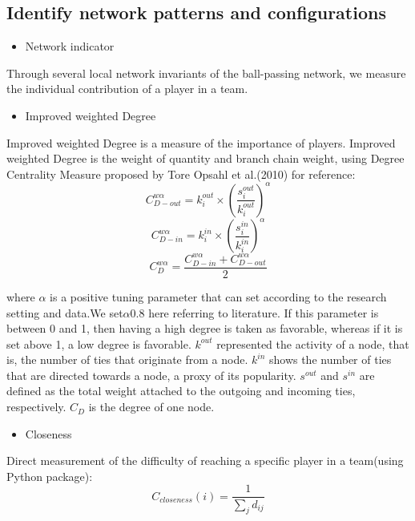 \documentclass{mcmthesis}
\begin{document}
\subsection{Identify network patterns and configurations}
\begin{itemize}
\item Network indicator
\end{itemize}

Through several local network invariants of the ball-passing network, we measure the individual contribution of a player in a team.
\begin{itemize}
\item Improved weighted Degree
\end{itemize}
Improved weighted Degree is a measure of the importance of players. Improved weighted Degree is the weight of quantity and branch chain weight, using Degree Centrality Measure proposed by Tore Opsahl et al.(2010) for reference:
\begin{equation}
C_{D-out}^{w\alpha}=k_{i}^{out}\times\left( \frac{s_{i}^{out}}{k_{i}^{out}}\right)^{\alpha}
\end{equation}
\begin{equation}
C_{D-in}^{w\alpha}=k_{i}^{in}\times\left( \frac{s_{i}^{in}}{k_{i}^{in}}\right)^{\alpha}
\end{equation}
\begin{equation}
C_{D}^{w\alpha}=\frac{C_{D-in}^{w\alpha}+C_{D-out}^{w\alpha}}{2}
\end{equation}


where $\alpha$ is a positive tuning parameter that can set according to the research setting and data.We set$\alpha$0.8 here referring to literature. If this parameter is between 0 and 1, then having a high degree is taken as favorable, whereas if it is set above 1, a low degree is favorable. $k^{out}$ represented the activity of a node, that is, the number of ties that originate from a node. $k^{in}$  shows the number of ties that are directed towards a node, a proxy of its popularity. $s^{out}$ and $s^{in}$ are defined as the total weight attached to the outgoing and incoming ties, respectively. $C_{D}$ is the degree of one node.

\begin{itemize}
\item Closeness
\end{itemize}
Direct measurement of the difficulty of reaching a specific player in a team(using Python package):
\begin{equation}
C_{closeness}\left(i\right)=\frac{1}{\sum\limits_{j}d_{ij}}
\end{equation}
\end{document}
